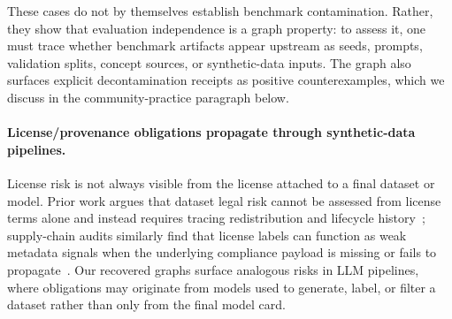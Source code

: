 These cases do not by themselves establish benchmark contamination. Rather, they show that evaluation independence is a graph property: to assess it, one must trace whether benchmark artifacts appear upstream as seeds, prompts, validation splits, concept sources, or synthetic-data inputs. The graph also surfaces explicit decontamination receipts as positive counterexamples, which we discuss in the community-practice paragraph below.

\paragraph{License/provenance obligations propagate through synthetic-data pipelines.}

License risk is not always visible from the license attached to a final dataset or model. Prior work argues that dataset legal risk cannot be assessed from license terms alone and instead requires tracing redistribution and lifecycle history~\cite{kim2025trustlicensesseedataset}; supply-chain audits similarly find that license labels can function as weak metadata signals when the underlying compliance payload is missing or fails to propagate~\cite{jewitt2026permissivewashingopenaisupply}. Our recovered graphs surface analogous risks in LLM pipelines, where obligations may originate from models used to generate, label, or filter a dataset rather than only from the final model card.

